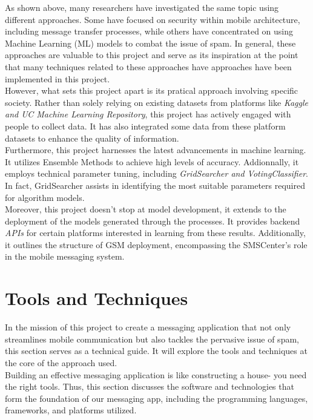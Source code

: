 \documentclass[12pt,a4paper]{report}
\begin{document}
	As shown above, many researchers have investigated the same topic using different approaches. Some have focused on security within mobile architecture, including message transfer processes, while others have concentrated on using Machine Learning (ML) models to combat the issue of spam. In general, these approaches are valuable to this project and serve as its inspiration at the point that many techniques related to these approaches have approaches have been implemented in this project.\\

    However, what sets this project apart is its pratical approach involving specific society. Rather than solely relying on existing datasets from platforms like \textit{Kaggle and UC Machine Learning Repository}, this project has actively engaged with people to collect data. It has also integrated some data from these platform datasets to enhance the quality of information. \\
        
    Furthermore, this project harnesses the latest advancements in machine learning. It utilizes Ensemble Methods to achieve high levels of accuracy. Addionnally, it employs technical parameter tuning, including \textit{GridSearcher and VotingClassifier}. In fact, GridSearcher assists in identifying the most suitable parameters required for algorithm models.  
    \\
    
    Moreover, this project doesn't stop at model development, it extends to the deployment of the models generated through the processes. It provides backend \textit{APIs} for certain platforms interested in learning from these results. Additionally, it outlines the structure of GSM deployment, encompassing the SMSCenter's role in the mobile messaging system.
   
   
    
   \section{Tools and Techniques} 
	In the mission of this project to create a messaging application that not only streamlines mobile communication but also tackles the pervasive issue of spam, this section serves as a technical guide. It will explore the tools and techniques at the core of the approach used. \\
		
	Building an effective messaging application is like constructing a house- you need the right tools. Thus, this section discusses the software and technologies that form the foundation of our messaging app, including the programming languages, frameworks, and platforms utilized. \\
	
\end{document}
